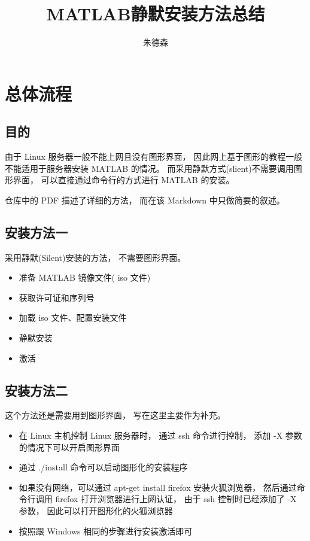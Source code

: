 \documentclass[UTF8]{article}   %
\author{朱德森}
\title{MATLAB静默安装方法总结}
\numberwithin{equation}{section} %
\begin{document}
\songti
\linespread{1.3}
\maketitle
\tableofcontents
\newpage
\section{总体流程}
\label{Sec 总体流程}

\subsection{目的}
\label{SubSec 目的}
由于 Linux 服务器一般不能上网且没有图形界面，
因此网上基于图形的教程一般不能适用于服务器安装 MATLAB 的情况。
而采用静默方式(slient)不需要调用图形界面，
可以直接通过命令行的方式进行 MATLAB 的安装。

仓库中的 PDF 描述了详细的方法，
而在该 Markdown 中只做简要的叙述。

\subsection{安装方法一}
\label{SubSec 安装方法一}
采用静默(Silent)安装的方法，
不需要图形界面。
\begin{itemize}
	\item 准备 MATLAB 镜像文件( iso 文件)
	\item 获取许可证和序列号
	\item 加载 iso 文件、配置安装文件
	\item 静默安装
	\item 激活
\end{itemize}


\subsection{安装方法二}
\label{SubSec 安装方法二}
这个方法还是需要用到图形界面，
写在这里主要作为补充。
\begin{itemize}
	\item 在 Linux 主机控制 Linux 服务器时，
	  通过 ssh 命令进行控制，
	  添加 -X 参数的情况下可以开启图形界面
	\item 通过 ./install 命令可以启动图形化的安装程序
	\item 如果没有网络，可以通过 apt-get install firefox 安装火狐浏览器，
	  然后通过命令行调用 firefox 打开浏览器进行上网认证，
	  由于 ssh 控制时已经添加了 -X 参数，
	  因此可以打开图形化的火狐浏览器
	\item 按照跟 Windows 相同的步骤进行安装激活即可
\end{itemize}
\end{document}
